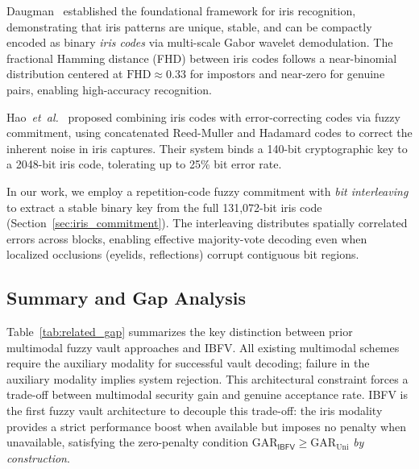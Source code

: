 \documentclass[conference]{IEEEtran}
\newcommand{\IBFV}{\textsf{IBFV}}
\newcommand{\GAR}{\mathrm{GAR}}
\newcommand{\FHD}{\mathrm{FHD}}
\begin{document}
Daugman~\cite{daugman2004how} established the foundational framework for iris recognition, demonstrating that iris patterns are unique, stable, and can be compactly encoded as binary \emph{iris codes} via multi-scale Gabor wavelet demodulation. The fractional Hamming distance (FHD) between iris codes follows a near-binomial distribution centered at $\FHD \approx 0.33$ for impostors and near-zero for genuine pairs, enabling high-accuracy recognition.

Hao~\textit{et~al.}~\cite{hao2006combining} proposed combining iris codes with error-correcting codes via fuzzy commitment, using concatenated Reed-Muller and Hadamard codes to correct the inherent noise in iris captures. Their system binds a 140-bit cryptographic key to a 2048-bit iris code, tolerating up to 25\% bit error rate. 

In our work, we employ a repetition-code fuzzy commitment with \emph{bit interleaving} to extract a stable binary key from the full 131,072-bit iris code (Section~\ref{sec:iris_commitment}). The interleaving distributes spatially correlated errors across blocks, enabling effective majority-vote decoding even when localized occlusions (eyelids, reflections) corrupt contiguous bit regions.

\subsection{Summary and Gap Analysis}

Table~\ref{tab:related_gap} summarizes the key distinction between prior multimodal fuzzy vault approaches and \IBFV{}. All existing multimodal schemes~\cite{nandakumar2008multibiometric,moon2010multibiometric} require the auxiliary modality for successful vault decoding; failure in the auxiliary modality implies system rejection. This architectural constraint forces a trade-off between multimodal security gain and genuine acceptance rate. \IBFV{} is the first fuzzy vault architecture to decouple this trade-off: the iris modality provides a strict performance boost when available but imposes no penalty when unavailable, satisfying the zero-penalty condition $\GAR_{\IBFV} \geq \GAR_{\text{Uni}}$ \emph{by construction}.
\end{document}
